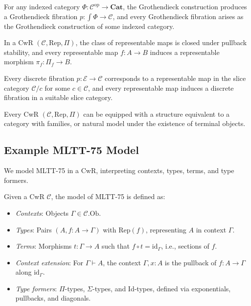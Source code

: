 \documentclass{article}
\begin{document}
\begin{theorem}
For any indexed category \(\Phi : \mathcal{C}^{\mathrm{op}} \to \mathbf{Cat}\), the Grothendieck construction produces a Grothendieck fibration \(p : \int \Phi \to \mathcal{C}\), and every Grothendieck fibration arises as the Grothendieck construction of some indexed category.
\end{theorem}

\begin{theorem}
In a CwR \((\mathcal{C}, \mathrm{Rep}, \Pi)\), the class of representable maps is closed under pullback stability, and every representable map \(f : A \to B\) induces a representable morphism \(\pi_f : \Pi_f \to B\).
\end{theorem}

\begin{theorem}
Every discrete fibration \(p : \mathcal{E} \to \mathcal{C}\) corresponds to a representable map in the slice category \(\mathcal{C}/c\) for some \(c \in \mathcal{C}\), and every representable map induces a discrete fibration in a suitable slice category.
\end{theorem}

\begin{theorem}
Every CwR \((\mathcal{C}, \mathrm{Rep}, \Pi)\) can be equipped with a
structure equivalent to a category with families,
or natural model under the existence of terminal objects.
\end{theorem}

\newpage
\subsection{Example MLTT-75 Model}

We model MLTT-75 in a CwR, interpreting contexts, types, terms, and type formers.

\begin{definition}
Given a CwR $\mathcal{C}$, the model of MLTT-75 is defined as:
\begin{itemize}
  \item \emph{Contexts}: Objects $\Gamma \in \mathcal{C}.\text{Ob}$.
  \item \emph{Types}: Pairs $(A, f : A \to \Gamma)$ with $\text{Rep}(f)$, representing $A$ in context $\Gamma$.
  \item \emph{Terms}: Morphisms $t : \Gamma \to A$ such that $f \circ t = \text{id}_\Gamma$, i.e., sections of $f$.
  \item \emph{Context extension}: For $\Gamma \vdash A$, the context $\Gamma, x : A$ is the pullback of $f : A \to \Gamma$ along $\text{id}_\Gamma$.
  \item \emph{Type formers}: $\Pi$-types, $\Sigma$-types, and Id-types, defined via exponentials, pullbacks, and diagonals.
\end{itemize}
\end{definition}
\end{document}
